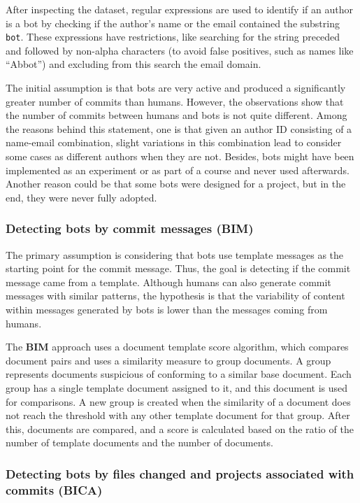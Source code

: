 \documentclass[a4paper, 12pt]{book}
\begin{document}
After inspecting the dataset, regular expressions are used to identify if an author is a bot by checking if the author's name or the email contained the substring \texttt{bot}. These expressions have restrictions, like searching for the string preceded and followed by non-alpha characters (to avoid false positives, such as names like ``Abbot'') and excluding from this search the email domain.

The initial assumption is that bots are very active and produced a significantly greater number of commits than humans. However, the observations show that the number of commits between humans and bots is not quite different. Among the reasons behind this statement, one is that given an author ID consisting of a name-email combination, slight variations in this combination lead to consider some cases as different authors when they are not. Besides, bots might have been implemented as an experiment or as part of a course and never used afterwards. Another reason could be that some bots were designed for a project, but in the end, they were never fully adopted.

\subsubsection{Detecting bots by commit messages (BIM)}
\label{sssec:dey-bim}

The primary assumption is considering that bots use template messages as the starting point for the commit message. Thus, the goal is detecting if the commit message came from a template. Although humans can also generate commit messages with similar patterns, the hypothesis is that the variability of content within messages generated by bots is lower than the messages coming from humans.

The \textbf{BIM} approach uses a document template score algorithm, which compares document pairs and uses a similarity measure to group documents. A group represents documents suspicious of conforming to a similar base document. Each group has a single template document assigned to it, and this document is used for comparisons. A new group is created when the similarity of a document does not reach the threshold with any other template document for that group. After this, documents are compared, and a score is calculated based on the ratio of the number of template documents and the number of documents. 

\subsubsection{Detecting bots by files changed and projects associated with commits (BICA)}
\label{sssec:dey-bica}
\end{document}
